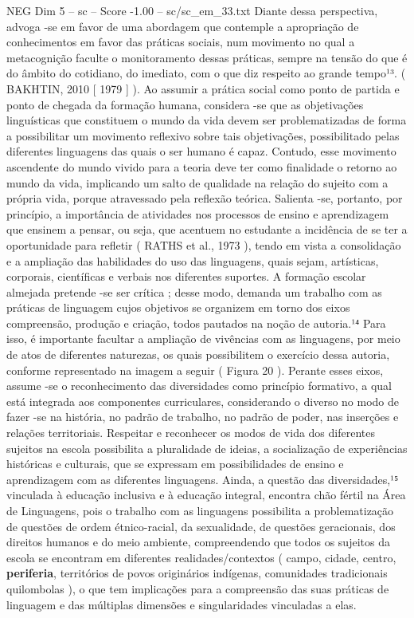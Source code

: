 \begin{textsample}{NEG Dim 5 – sc – Score -1.00 – sc/sc\_em\_33.txt}
Diante dessa perspectiva, advoga -se em favor de uma abordagem que contemple a apropriação de conhecimentos em favor das práticas sociais, num movimento no qual a metacognição faculte o monitoramento dessas práticas, sempre na tensão do que é do âmbito do cotidiano, do imediato, com o que diz respeito ao grande tempo¹³. ( BAKHTIN, 2010 [ 1979 ] ).
Ao assumir a prática social como ponto de partida e ponto de chegada da formação humana, considera -se que as objetivações linguísticas que constituem o mundo da vida devem ser problematizadas de forma a possibilitar um movimento reflexivo sobre tais objetivações, possibilitado pelas diferentes linguagens das quais o ser humano é capaz.
Contudo, esse movimento ascendente do mundo vivido para a teoria deve ter como finalidade o retorno ao mundo da vida, implicando um salto de qualidade na relação do sujeito com a própria vida, porque atravessado pela reflexão teórica.
Salienta -se, portanto, por princípio, a importância de atividades nos processos de ensino e aprendizagem que ensinem a pensar, ou seja, que acentuem no estudante a incidência de se ter a oportunidade para refletir ( RATHS et al., 1973 ), tendo em vista a consolidação e a ampliação das habilidades do uso das linguagens, quais sejam, artísticas, corporais, científicas e verbais nos diferentes suportes.
A formação escolar almejada pretende -se ser crítica ; desse modo, demanda um trabalho com as práticas de linguagem cujos objetivos se organizem em torno dos eixos compreensão, produção e criação, todos pautados na noção de autoria.¹⁴ Para isso, é importante facultar a ampliação de vivências com as linguagens, por meio de atos de diferentes naturezas, os quais possibilitem o exercício dessa autoria, conforme representado na imagem a seguir ( Figura 20 ).
Perante esses eixos, assume -se o reconhecimento das diversidades como princípio formativo, a qual está integrada aos componentes curriculares, considerando o diverso no modo de fazer -se na história, no padrão de trabalho, no padrão de poder, nas inserções e relações territoriais.
Respeitar e reconhecer os modos de vida dos diferentes sujeitos na escola possibilita a pluralidade de ideias, a socialização de experiências históricas e culturais, que se expressam em possibilidades de ensino e aprendizagem com as diferentes linguagens.
Ainda, a questão das diversidades,¹⁵ vinculada à educação inclusiva e à educação integral, encontra chão fértil na Área de Linguagens, pois o trabalho com as linguagens possibilita a problematização de questões de ordem étnico-racial, da sexualidade, de questões geracionais, dos direitos humanos e do meio ambiente, compreendendo que todos os sujeitos da escola se encontram em diferentes realidades/contextos ( campo, cidade, centro, \textbf{periferia}, territórios de povos originários indígenas, comunidades tradicionais quilombolas ), o que tem implicações para a compreensão das suas práticas de linguagem e das múltiplas dimensões e singularidades vinculadas a elas.

\end{textsample}
